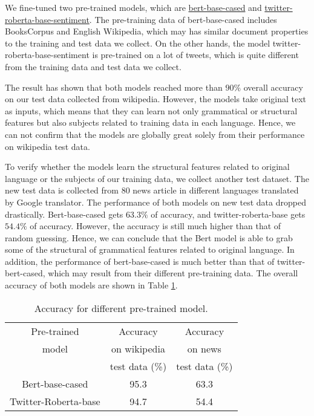 \documentclass[twocolumn]{article}
\begin{document}
We fine-tuned two pre-trained models, which are \href{https://huggingface.co/bert-base-cased}{bert-base-cased} and  \href{https://huggingface.co/cardiffnlp/twitter-roberta-base-sentiment}{twitter-roberta-base-sentiment}. The pre-training data of bert-base-cased includes BooksCorpus and English Wikipedia, which may has similar document properties to the training and test data we collect. On the other hands, the model twitter-roberta-base-sentiment is pre-trained on a lot of tweets, which is quite different from the training data and test data we collect.

The result has shown that both models reached more than $90\%$ overall accuracy on our test data collected from wikipedia. However, the models take original text as inputs, which means that they can learn not only grammatical or structural features but also subjects related to training data in each language. Hence, we can not confirm that the models are globally great solely from their performance on wikipedia test data.

To verify whether the models learn the structural features related to original language or the subjects of our training data, we collect another test dataset. The new test data is collected from 80 news article in different languages translated by Google translator. The performance of both models on new test data dropped drastically. Bert-base-cased gets $63.3\%$ of accuracy, and twitter-roberta-base gets $54.4\%$ of accuracy. However, the accuracy is still much higher than that of random guessing. Hence, we can conclude that the Bert model is able to grab some of the structural of grammatical features related to original language. In addition, the performance of bert-base-cased is much better than that of twitter-bert-cased, which may result from their different pre-training data. The overall accuracy of both models are shown in Table \ref{fig:accuracy_bert}.

\begin{table}
    \begin{center}
        \begin{tabular}{c | c c}
            Pre-trained & Accuracy & Accuracy \\ model & on wikipedia & on news \\ & test data (\%) & test data (\%) \\
            \hline
            Bert-base-cased & 95.3 & 63.3 \\
            Twitter-Roberta-base & 94.7 & 54.4 \\
        \end{tabular}
        \caption{Accuracy for different pre-trained model.}
        \label{fig:accuracy_bert}
    \end{center}
\end{table}
\end{document}
